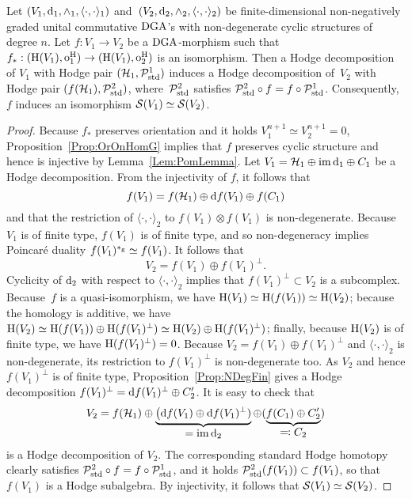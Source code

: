 \documentclass[\MainFolder/Text.tex]{subfiles}
\begin{document}
\begin{Lemma}\label{Eq:LemSmallSub}
Let $(V_1,\mathrm{d}_1,\wedge_1,\langle\cdot,\cdot\rangle_1)$ and~$(V_2,\mathrm{d}_2,\wedge_2,\langle\cdot,\cdot\rangle_2)$ be finite-dimensional non-negatively graded unital commutative $\mathrm{DGA}$'s with non-degenerate cyclic structures of degree $n$. Let $f: V_1 \rightarrow V_2$ be a $\mathrm{DGA}$-morphism such that $f_*: (\mathrm{H}(V_1),\mathrm{o}_1^{\mathrm{H}})\rightarrow (\mathrm{H}(V_1),\mathrm{o}_2^{\mathrm{H}})$ is an isomorphism. Then a Hodge decomposition of $V_1$ with Hodge pair $(\mathcal{H}_1,\mathcal{P}_{\mathrm{std}}^1)$ induces a Hodge decomposition of~$V_2$ with Hodge pair $(f(\mathcal{H}_1),\mathcal{P}_{\mathrm{std}}^2)$, where~$\mathcal{P}_{\mathrm{std}}^2$ satisfies $\mathcal{P}_{\mathrm{std}}^2 \circ f = f\circ \mathcal{P}_{\mathrm{std}}^1$. Consequently,~$f$ induces an isomorphism $\mathcal{S}(V_1) \simeq \mathcal{S}(V_2)$.
\end{Lemma}
\begin{proof}
Because $f_*$ preserves orientation and it holds $V_1^{n+1} \simeq V_2^{n+1} = 0$, Proposition~\ref{Prop:OrOnHomG} implies that $f$ preserves cyclic structure and hence is injective by Lemma~\ref{Lem:PomLemma}. Let $V_1 = \mathcal{H}_1 \oplus \operatorname{im} \mathrm{d}_1 \oplus C_1$ be a Hodge decomposition. From the injectivity of $f$, it follows that
$$ f(V_1) = f(\mathcal{H}_1) \oplus \mathrm{d} f(V_1) \oplus f(C_1) $$
and that the restriction of $\langle\cdot,\cdot\rangle_2$ to $f(V_1)\otimes f(V_1)$ is non-degenerate. Because $V_1$ is of finite type, $f(V_1)$ is of finite type, and so non-degeneracy implies Poincar\'e duality $f(V_1)^{*_{\mathrm{g}}}\simeq f(V_1)$. It follows that
$$ V_2 = f(V_1) \oplus f(V_1)^\perp.$$
Cyclicity of $\mathrm{d}_2$ with respect to $\langle\cdot,\cdot\rangle_2$ implies that $f(V_1)^\perp\subset V_2$ is a subcomplex. Because~$f$ is a quasi-isomorphism, we have $\mathrm{H}(V_1)\simeq \mathrm{H}(f(V_1))\simeq \mathrm{H}(V_2)$; because the homology is additive, we have $\mathrm{H}(V_2)\simeq\mathrm{H}(f(V_1))\oplus\mathrm{H}(f(V_1)^\perp)\simeq \mathrm{H}(V_2)\oplus\mathrm{H}(f(V_1)^\perp)$; finally, because $\mathrm{H}(V_2)$ is of finite type, we have $\mathrm{H}(f(V_1)^\perp) = 0$. Because $V_2 = f(V_1) \oplus f(V_1)^\perp$ and $\langle\cdot,\cdot\rangle_2$ is non-degenerate, its restriction to $f(V_1)^\perp$ is non-degenerate too. As $V_2$ and hence $f(V_1)^\perp$ is of finite type, Proposition~\ref{Prop:NDegFin} gives a Hodge decomposition $f(V_1)^\perp = \mathrm{d} f(V_1)^\perp \oplus C_2'$. It is easy to check that 
$$ V_2 = f(\mathcal{H}_1)\oplus\underbrace{\bigl(\mathrm{d} f(V_1) \oplus \mathrm{d} f(V_1)^\perp)}_{\displaystyle=\operatorname{im}\mathrm{d}_2}\oplus(\underbrace{f(C_1)\oplus C_2'}_{\displaystyle\eqqcolon C_2})$$
is a Hodge decomposition of $V_2$. The corresponding standard Hodge homotopy clearly satisfies $\mathcal{P}_{\mathrm{std}}^2 \circ f = f\circ \mathcal{P}_{\mathrm{std}}^1$, and it holds $\mathcal{P}_{\mathrm{std}}^2(f(V_1)) \subset f(V_1)$, so that $f(V_1)$ is a Hodge subalgebra. By injectivity, it follows that $\mathcal{S}(V_1) \simeq \mathcal{S}(V_2)$.
\end{proof}
\end{document}
